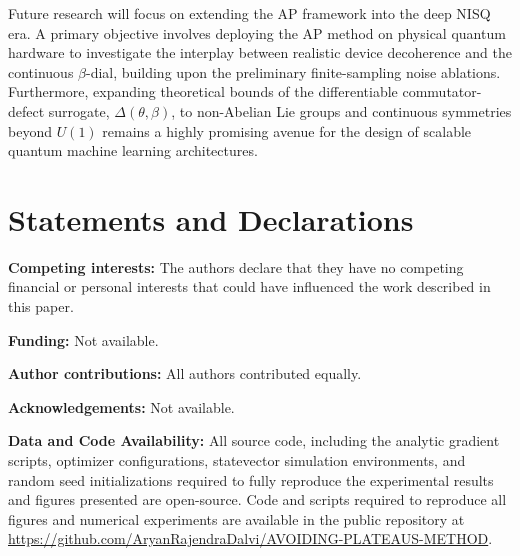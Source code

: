 \documentclass[pdflatex,sn-mathphys-num]{sn-jnl}
\theoremstyle{thmstyleone}
\theoremstyle{thmstyletwo}
\theoremstyle{thmstylethree}
\begin{document}
Future research will focus on extending the AP framework into the deep NISQ era. A primary objective involves deploying the AP method on physical quantum hardware to investigate the interplay between realistic device decoherence and the continuous $\beta$-dial, building upon the preliminary finite-sampling noise ablations. Furthermore, expanding theoretical bounds of the differentiable commutator-defect surrogate, $\Delta(\theta, \beta)$, to non-Abelian Lie groups and continuous symmetries beyond $U(1)$ remains a highly promising avenue for the design of scalable quantum machine learning architectures.




\section*{Statements and Declarations}

\textbf{Competing interests:} The authors declare that they have no competing financial or personal interests that could have influenced the work described in this paper.

\textbf{Funding:} Not available.

\textbf{Author contributions:} All authors contributed equally.

\textbf{Acknowledgements:} Not available.

\textbf{Data and Code Availability:}
\label{sec:data}
All source code, including the analytic gradient scripts, optimizer configurations, statevector simulation environments, and random seed initializations required to fully reproduce the experimental results and figures presented are open-source. Code and scripts required to reproduce all figures and numerical experiments are available in the public repository at \url{https://github.com/AryanRajendraDalvi/AVOIDING-PLATEAUS-METHOD}.
\end{document}
